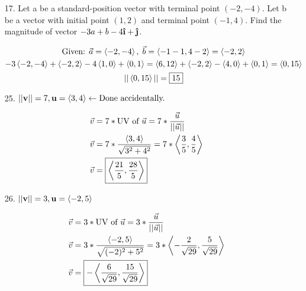 \documentclass[10pt, letterpaper]{article}
\begin{document}
\begin{itemize}
        \pagebreak

        \item [17.] Let a be a standard-position vector with terminal point $(-2, -4)$. Let b be a vector with initial point $(1, 2)$ and terminal point $(-1, 4)$. Find the magnitude of vector $-3a + b - 4\ihat + \jhat$. 
        
        \begin{mdframed}
            \begin{equation*}
                \begin{gathered}
                    \text{Given: } \vec{a} = \expval{-2, -4}, \; 
                    \vec{b} = \expval{-1 - 1, 4 - 2} = \expval{-2, 2}                   \\
                    -3\expval{-2, -4} + \expval{-2, 2} - 4\expval{1, 0} + \expval{0, 1}
                    = \expval{6, 12} + \expval{-2, 2} - \expval{4, 0} + \expval{0, 1}
                    = \expval{0, 15} \\
                    ||\expval{0, 15}|| = \boxed{15}
                \end{gathered}
            \end{equation*}
        \end{mdframed}

        \item [25.] $||\mathbf{v}|| = 7, \mathbf{u} = \expval{3, 4} \leftarrow \text{Done accidentally.}$
        
        \begin{mdframed}
            \begin{align*}
                \vec{v} & = 7 * \text{UV of } \vec{u} = 7 *  \frac{\vec{u}}{||\vec{u}||}\\
                \vec{v} & = 7 * \frac{\expval{3,4}}{\sqrt{3^2 + 4^2}}                   
                          = 7 * \expval{\frac{3}{5}, \frac{4}{5}}                       \\
                \vec{v} & = \boxed{\expval{\frac{21}{5}, \frac{28}{5}}}
            \end{align*}
        \end{mdframed}

        \item [26.] $||\mathbf{v}|| = 3, \mathbf{u} = \expval{-2, 5}$
        
        \begin{mdframed}
            \begin{align*}
                \vec{v} & = 3 * \text{UV of } \vec{u} = 3 *  \frac{\vec{u}}{||\vec{u}||}\\
                \vec{v} & = 3 * \frac{\expval{-2,5}}{\sqrt{(-2)^2 + 5^2}} 
                          = 3 * \expval{-\frac{2}{\sqrt{29}}, \frac{5}{\sqrt{29}}}      \\
                \vec{v} & = \boxed{-\expval{\frac{6}{\sqrt{29}}, \frac{15}{\sqrt{29}}}}
            \end{align*}
        \end{mdframed}


\end{itemize}
\end{document}

